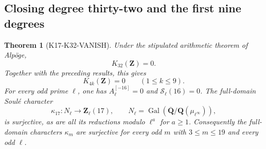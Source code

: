 \documentclass[11pt,a4paper]{article}
\newtheorem{theorem}{Theorem}[section]
\theoremstyle{definition}
\begin{document}
\subsection{Closing degree thirty-two and the first nine degrees}
\label{sec:k32-vanishing}

\begin{theorem}[K17-K32-VANISH]\label{thm:k32-vanish}
Under the stipulated arithmetic theorem of Alp\"oge,
\[
                         K_{32}(\mathbf Z)=0.
 \tag{K32.1}
\]
Together with the preceding results, this gives
\[
             K_{4k}(\mathbf Z)=0\qquad(1\leq k\leq9).
 \tag{K32.2}
\]
For every odd prime $\ell$, one has
$A_\ell^{[-16]}=0$ and $\mathcal S_\ell(16)=0$.
The full-domain Soul\'e character
\[
 \kappa_{17}:N_\ell\longrightarrow\mathbf Z_\ell(17),
 \qquad N_\ell=\operatorname{Gal}
 (\overline{\mathbf Q}/\mathbf Q(\mu_{\ell^\infty})),
\]
is surjective, as are all its reductions modulo $\ell^a$ for $a\geq1$.
Consequently the full-domain characters $\kappa_m$ are surjective
for every odd $m$ with $3\leq m\leq19$ and every odd $\ell$.
\end{theorem}
\end{document}
